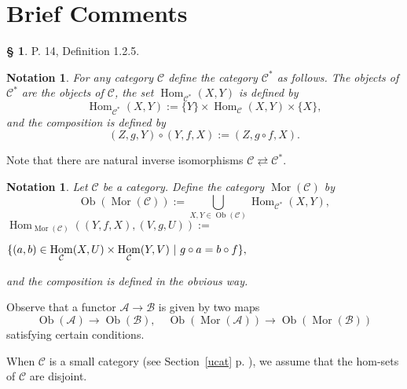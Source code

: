 \documentclass[12pt]{article}
\newtheorem{nota}[thm]{Notation}
\theoremstyle{remark}
\theoremstyle{definition}
\newtheorem{s}[thm]{\S}
\newcommand{\A}{\mathcal A}
\newcommand{\B}{\mathcal B}
\newcommand{\C}{\mathcal C}
\newcommand{\U}{\mathcal U}
\DeclareMathOperator{\Hom}{Hom}%
\DeclareMathOperator{\Mor}{Mor}
\DeclareMathOperator{\Ob}{Ob}
\begin{document}
\section{Brief Comments}\label{bc} %
%
\begin{s}\label{d125} 
P. 14, Definition 1.2.5.
%
\begin{nota}\label{c*}
%
For any category $\C$ define the category $\C^*$ as follows. The objects of $\C^*$ are the objects of $\C$, the set $\Hom_{\C^*}(X,Y)$ is defined by 
$$
\Hom_{\C^*}(X,Y):=\{Y\}\times\Hom_{\C}(X,Y)\times\{X\},
$$
and the composition is defined by 
$$
(Z,g,Y)\circ(Y,f,X):=(Z,g\circ f,X).
$$ 
%
\end{nota}
%
Note that there are natural inverse isomorphisms $\C\rightleftarrows\C^*$. 
%
\begin{nota}\label{mor}
%
Let $\C$ be a category. Define the category $\Mor(\C)$ by 
$$
\Ob(\Mor(\C)):=\bigcup_{X,Y\in\Ob(\C)}\Hom_{\C^*}(X,Y),
$$
$\displaystyle \Hom_{\Mor(\C)}((Y,f,X),(V,g,U)):=$\bigskip 

$\hfill\displaystyle\{(a,b)\in\Hom_\C(X,U)\times\Hom_\C(Y,V)\ | \ g\circ a=b\circ f\},$\bigskip 

\noindent and the composition is defined in the obvious way.
%
\end{nota}
%
Observe that a functor $\A\to\B$ is given by two maps 
$$
\Ob(\A)\to\Ob(\B),\quad\Ob(\Mor(\A))\to\Ob(\Mor(\B))
$$ 
satisfying certain conditions.

When $\C$ is a small category (see Section~\ref{ucat} p. \pageref{ucat}), we assume that the hom-sets of $\C$ are disjoint.
\end{s}
%
%
%
%
\end{document}
